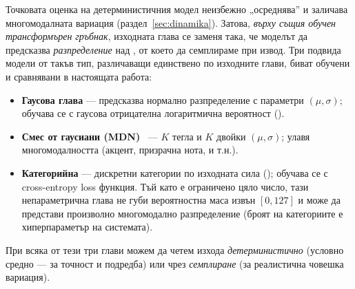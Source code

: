 Точковата оценка на детерминистичния модел неизбежно „осреднява'' и заличава многомодалната вариация
(раздел~\ref{sec:dinamika}). Затова, \emph{върху същия обучен трансформърен гръбнак},
изходната глава се заменя така, че моделът да предсказва \emph{разпределение} над
, от което да семплираме при извод.
Три подвида модели от такъв тип, различаващи единствено по изходните глави,
биват обучени и сравнявани в настоящата работа:
\begin{itemize}
  \item \textbf{Гаусова глава} — предсказва нормално разпределение с параметри $(\mu,\sigma)$;
        обучава се с гаусова
        отрицателна логаритмична вероятност ().
  \item \textbf{Смес от гаусиани (MDN)}~\cite{bishop1994mdn} — $K$ тегла и $K$
        двойки $(\mu,\sigma)$; улавя многомодалността (акцент, призрачна нота, и т.н.).
  \item \textbf{Категорийна} — дискретни категории по изходната сила ();
        обучава се с cross-entropy loss функция. Тъй като  е ограничено
        цяло число, тази непараметрична глава не губи вероятностна маса извън
        $[0,127]$ и може да представи произволно многомодално разпределение
        (броят на категориите е хиперпараметър на системата).
\end{itemize}
При всяка от тези три глави можем да четем изхода \emph{детерминистично} (условно средно —
за точност и подредба) или чрез \emph{семплиране} (за реалистична човешка
вариация).
